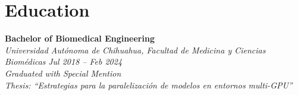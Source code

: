 \section*{Education}

\textbf{Bachelor of Biomedical Engineering}
\\
\textit{
    Universidad Autónoma de Chihuahua, Facultad de Medicina y Ciencias Biomédicas
    } 
\hfill 
\textit{
    \color{lightgray}Jul 2018 -- Feb 2024
}
\\
{
    \textit{Graduated with Special Mention}
}
\\
{
    \color{mediumgray}\textit{Thesis: “Estrategias para la paralelización de modelos en entornos multi-GPU”}}
